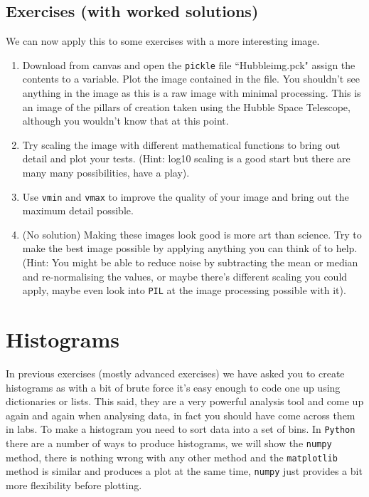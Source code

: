 \subsection{Exercises (with worked solutions)} \label{sec:exc_hubble}

We can now apply this to some exercises with a more interesting image.

\begin{enumerate}
\item Download from canvas and open the \texttt{pickle} file ``Hubbleimg.pck" assign the contents to a variable. Plot the image contained in the file. You shouldn't see anything in the image as this is a raw image with minimal processing. This is an image of the pillars of creation taken using the Hubble Space Telescope, although you wouldn't know that at this point.
\item Try scaling the image with different mathematical functions to bring out detail and plot your tests. (Hint: log10 scaling is a good start but there are many many possibilities, have a play).
\item Use \texttt{vmin} and \texttt{vmax} to improve the quality of your image and bring out the maximum detail possible.
\item (No solution) Making these images look good is more art than science. Try to make the best image possible by applying anything you can think of to help. (Hint: You might be able to reduce noise by subtracting the mean or median and re-normalising the values, or maybe there's different scaling you could apply, maybe even look into \texttt{PIL} at the image processing possible with it).
\end{enumerate}

\newpage

\section{Histograms}

In previous exercises (mostly advanced exercises) we have asked you to create histograms as with a bit of brute force it's easy enough to code one up using dictionaries or lists. This said, they are a very powerful analysis tool and come up again and again when analysing data, in fact you should have come across them in labs. To make a histogram you need to sort data into a set of bins. In \texttt{Python} there are a number of ways to produce histograms, we will show the \texttt{numpy} method, there is nothing wrong with any other method and the \texttt{matplotlib} method is similar and produces a plot at the same time, \texttt{numpy} just provides a bit more flexibility before plotting.

